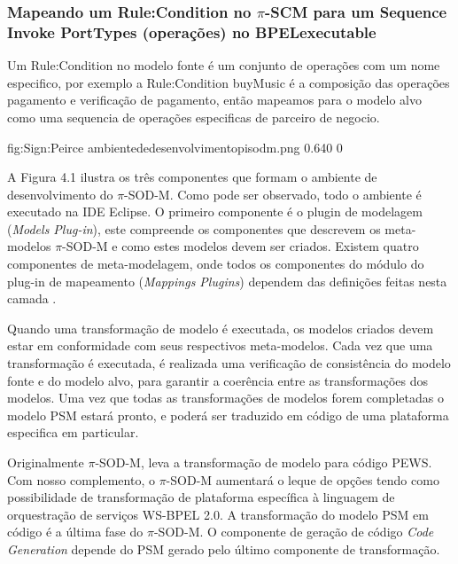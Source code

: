 \subsubsection{Mapeando um Rule:Condition no $\pi$-SCM para um Sequence Invoke PortTypes (operações) no BPELexecutable}

Um Rule:Condition no modelo fonte é um conjunto de operações com um nome especifico, por exemplo a Rule:Condition buyMusic é a composição das operações pagamento e verificação de pagamento, então mapeamos para o modelo alvo como uma sequencia de operações especificas de parceiro de negocio.






       {fig:Sign:Peirce}
       {ambientededesenvolvimentopisodm.png}
       {0.640}
       {0}

A Figura 4.1 ilustra os três componentes que formam o ambiente de desenvolvimento do $\pi$-SOD-M. Como pode ser observado, todo o ambiente é executado na IDE Eclipse. O primeiro componente é o plugin de modelagem (\textit{Models Plug-in}), este compreende os componentes que descrevem os meta-modelos $\pi$-SOD-M e como estes modelos devem ser criados. Existem quatro componentes de meta-modelagem, onde todos os componentes do módulo do plug-in de mapeamento (\textit{Mappings Plugins}) dependem das definições feitas nesta camada \cite{Placido}.

Quando uma transformação de modelo é executada, os modelos criados devem estar em conformidade com seus respectivos meta-modelos. Cada vez que uma transformação é executada, é realizada uma verificação de consistência do modelo fonte e do modelo alvo, para garantir a coerência entre as transformações dos modelos. Uma vez que todas as transformações de modelos forem completadas o modelo PSM estará pronto, e poderá ser traduzido em código de uma plataforma especifica em particular. 

Originalmente $\pi$-SOD-M, leva a transformação de modelo para código PEWS. Com nosso complemento, o $\pi$-SOD-M aumentará o leque de opções tendo como possibilidade de transformação de plataforma específica à linguagem de orquestração de serviços WS-BPEL 2.0. A transformação do modelo PSM em código é a última fase do $\pi$-SOD-M. O componente de geração de código \textit{Code Generation} depende do PSM gerado pelo último componente de transformação. 


